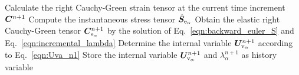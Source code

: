 \begin{algorithm}
	\caption{Numerical procedure for the calculation of the internal variable in the incompressible case.}
  \label{alg:incompressible_internal_variable}
	\begin{algorithmic}[1]
		\State Calculate the right Cauchy-Green strain tensor at the current time increment $\C^{n+1}$
		\State Compute the instantaneous stress tensor $\hat\S_{\mathrm{e}_\alpha}$
		\State Obtain the elastic right Cauchy-Green tensor $\C_{\mathrm{e}_{\alpha}}^{n+1}$ by the solution of Eq.~\eqref{eqn:backward_euler_S} and Eq.~\eqref{eqn:incremental_lambda}
		\State Determine the internal variable $\U^{n+1}_{\mathrm{v}_\alpha}$ according to Eq.~\eqref{eqn:Uva_n1}
		\EndFor
		\State Store the internal variable $\U^{n+1}_{\mathrm{v}_\alpha}$ and $\lambda_\alpha^{n+1}$ as history variable
		\EndFor
	\end{algorithmic} 
\end{algorithm}


